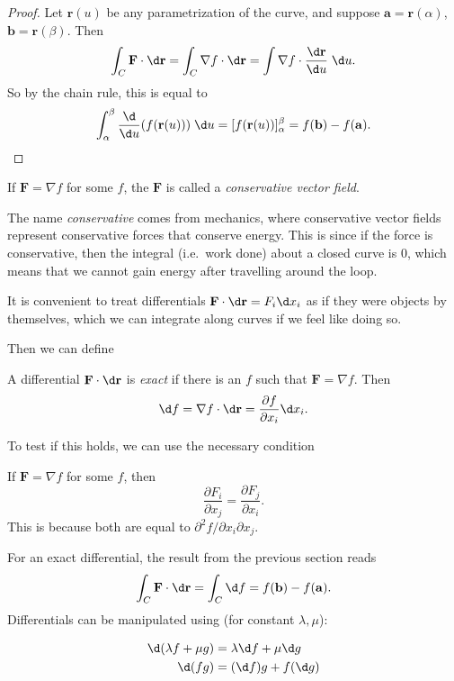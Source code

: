 \documentclass[a4paper]{article}
\begin{document}
\begin{proof}
  Let $\mathbf{r}(u)$ be any parametrization of the curve, and suppose $\mathbf{a} = \mathbf{r}(\alpha)$, $\mathbf{b} = \mathbf{r}(\beta)$. Then
  \[
    \int_C \mathbf{F}\cdot \d \mathbf{r} = \int_C\nabla f\cdot \d \mathbf{r} = \int \nabla f\cdot \frac{\d \mathbf{r}}{\d u}\; \d u.
  \]
  So by the chain rule, this is equal to
  \[
    \int_\alpha^\beta \frac{\d }{\d u} (f(\mathbf{r}(u))) \;\d u = [f(\mathbf{r}(u))]_\alpha^\beta = f(\mathbf{b}) - f(\mathbf{a}).\qedhere
  \]
\end{proof}

\begin{defi}
  If $\mathbf{F} = \nabla f$ for some $f$, the $\mathbf{F}$ is called a \emph{conservative vector field}.
\end{defi}

The name \emph{conservative} comes from mechanics, where conservative vector fields represent conservative forces that conserve energy. This is since if the force is conservative, then the integral (i.e.\ work done) about a closed curve is $0$, which means that we cannot gain energy after travelling around the loop.

It is convenient to treat differentials $\mathbf{F}\cdot \d \mathbf{r} = F_i \d x_i$ as if they were objects by themselves, which we can integrate along curves if we feel like doing so.

Then we can define
\begin{defi}
  A differential $\mathbf{F}\cdot\d \mathbf{r}$ is \emph{exact} if there is an $f$ such that $\mathbf{F} = \nabla f$. Then
  \[
    \d f = \nabla f\cdot \d \mathbf{r} = \frac{\partial f}{\partial x_i} \d x_i.
  \]
\end{defi}

To test if this holds, we can use the necessary condition
\begin{prop}
  If $\mathbf{F} = \nabla f$ for some $f$, then
  \[
    \frac{\partial F_i}{\partial x_j} = \frac{\partial F_j}{\partial x_i}.
  \]
  This is because both are equal to $\partial^2 f/\partial x_i\partial x_j$.
\end{prop}

For an exact differential, the result from the previous section reads
\[
  \int_C \mathbf{F}\cdot \d \mathbf{r} = \int_C \d f = f(\mathbf{b}) - f(\mathbf{a}).
\]
Differentials can be manipulated using (for constant $\lambda, \mu$):
\begin{prop}
  \begin{align*}
    \d (\lambda f + \mu g) &= \lambda \d f + \mu \d g\\
    \d (fg) &= (\d f)g + f(\d g)
  \end{align*}
\end{prop}
\end{document}
